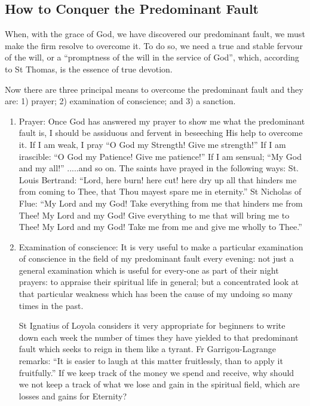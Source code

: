 \subsection*{How to Conquer the Predominant Fault}

When, with the grace of God, we have discovered our predominant fault, we must make the firm resolve to overcome it. To do so, we need a true and stable fervour of the will, or a ``promptness of the will in the service of God'', which, according to St Thomas, is the essence of true devotion. 

Now there are three principal means to overcome the predominant fault and they are: 1) prayer; 2) examination of conscience; and 3) a sanction.

\begin{enumerate}
\item Prayer: Once God has answered my prayer to show me what the predominant fault is, I should be assiduous and fervent in beseeching His help to overcome it. If I am weak, I pray ``O God my Strength! Give me strength!'' If I am irascible: ``O God my Patience! Give me patience!'' If I am sensual; ``My God and my all!'' .....and so on. The saints have prayed in the following ways: St. Louis Bertrand: ``Lord, here burn! here cut! here dry up all that hinders me from coming to Thee, that Thou mayest spare me in eternity.'' St Nicholas of Flue: “My Lord and my God! Take everything from me that hinders me from Thee! My Lord and my God! Give everything to me that will bring me to Thee! My Lord and my God! Take me from me and give me wholly to Thee.'' 

\item Examination of conscience: It is very useful to make a particular examination of conscience in the field of my predominant fault every evening: not just a general examination which is useful for every-one as part of their night prayers: to appraise their spiritual life in general; but a concentrated look at that particular weakness which has been the cause of my undoing so many times in the past. 

St Ignatius of Loyola considers it very appropriate for beginners to write down each week the number of times they have yielded to that predominant fault which seeks to reign in them like a tyrant. Fr Garrigou-Lagrange remarks: ``It is easier to laugh at this matter fruitlessly, than to apply it fruitfully.'' If we keep track of the money we spend and receive, why should we not keep a track of what we lose and gain in the spiritual field, which are losses and gains for Eternity? 


\end{enumerate}
